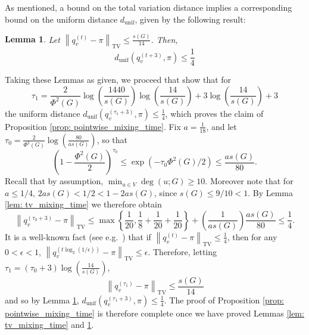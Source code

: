 \documentclass[11pt,twoside]{article}
\newtheorem{lemma}{Lemma}
\theoremstyle{definition}
\newcommand{\set}[1]{\left\{#1\right\}}
\newcommand{\norm}[1]{\left\lVert#1\right\rVert}
\newcommand{\1}{\mathbbm{1}}
\begin{document}
As mentioned, a bound on the total variation distance implies a corresponding bound on the uniform distance $d_{\mathrm{unif}}$, given by the following result:
\begin{lemma}
	\label{lem: tv_to_uniform_distance}
	Let $\norm{q_v^{(t)} - \pi}_{\mathrm{TV}} \leq \frac{s(G)}{14}$. Then,
	\begin{equation*}
	d_{\mathrm{unif}}(q_v^{(t + 3)},\pi) \leq \frac{1}{4}
	\end{equation*}
\end{lemma}

\noindent Taking these Lemmas as given, we proceed that show that for
\begin{equation*}
\tau_1 = \frac{2}{\Phi^2(G)} \log \left(\frac{1440}{s(G)}\right)\log \left(\frac{14}{s(G)}\right)  + 3 \log \left(\frac{14}{s(G)}\right) + 3
\end{equation*}
the uniform distance $d_{\textrm{unif}}(q_v^{(\tau_1 + 3)}, \pi) \leq \frac{1}{4}$, which proves the claim of Proposition \ref{prop: pointwise_mixing_time}. Fix $a = \frac{1}{18}$, and let $\tau_0 = \frac{2}{\Phi^2(G)} \log \left(\frac{80}{a s(G)}\right)$, so that
\begin{equation*}
\left(1 - \frac{\Phi^2(G)}{2}\right)^{\tau_0} \leq \exp(- \tau_0\Phi^2(G)/2) \leq \frac{as(G)}{80}.
\end{equation*}
Recall that by assumption, $\min_{u \in V} \deg(u;G) \geq 10$. Moreover note that for $a \leq 1/4$, $2as(G) < 1/2 < 1 - 2as(G)$, since $s(G) \leq 9/10 < 1$. By Lemma \ref{lem: tv_mixing_time} we therefore obtain
\begin{equation*}
\norm{q_v^{(\tau_0 + 3)} - \pi}_{\mathrm{TV}} \leq \max \set{\frac{1}{20}, \frac{1}{8} + \frac{1}{20} + \frac{1}{20}} + \left(\frac{1}{as(G)}\right) \frac{as(G)}{80} \leq \frac{1}{4}.
\end{equation*}
It is a well-known fact (see e.g.~\cite{montenegro2002}) that if $\norm{q_v^{(t)} - \pi}_{\mathrm{TV}} \leq \frac{1}{4}$, then for any $0 < \epsilon < 1$, $\norm{q_v^{(t\log_2(1/\epsilon))} - \pi}_{\mathrm{TV}} \leq \epsilon$. Therefore, letting $\tau_1 = (\tau_0 + 3) \log(\frac{14}{s(G)})$, 
\begin{equation*}
\norm{q_v^{(\tau_1)} - \pi}_{\mathrm{TV}} \leq \frac{s(G)}{14}
\end{equation*}
and so by Lemma \ref{lem: tv_to_uniform_distance}, $d_{\textrm{unif}}(q_v^{(\tau_1 + 3)}, \pi) \leq \frac{1}{4}$. The proof of Proposition \ref{prop: pointwise_mixing_time} is therefore complete once we have proved Lemmas \ref{lem: tv_mixing_time} and \ref{lem: tv_to_uniform_distance}.
\end{document}

